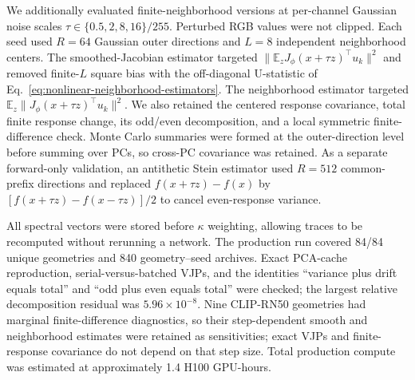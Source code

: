 We additionally evaluated finite-neighborhood versions at per-channel Gaussian
noise scales $\tau\in\{0.5,2,8,16\}/255$.  Perturbed RGB values were not
clipped.  Each seed used $R=64$ Gaussian outer directions and $L=8$
independent neighborhood centers.  The smoothed-Jacobian estimator targeted
$\|\mathbb E_z J_\phi(x+\tau z)^\top u_k\|^2$ and removed finite-$L$ square
bias with the off-diagonal U-statistic of
Eq.~\ref{eq:nonlinear-neighborhood-estimators}.  The neighborhood estimator
targeted $\mathbb E_z\|J_\phi(x+\tau z)^\top u_k\|^2$.  We also retained the
centered response covariance, total finite response change, its odd/even
decomposition, and a local symmetric finite-difference check.  Monte Carlo
summaries were formed at the outer-direction level before summing over PCs, so
cross-PC covariance was retained.  As a separate forward-only validation, an
antithetic Stein estimator used $R=512$ common-prefix directions and replaced
$f(x+\tau z)-f(x)$ by
$[f(x+\tau z)-f(x-\tau z)]/2$ to cancel even-response variance.

All spectral vectors were stored before $\kappa$ weighting, allowing traces to
be recomputed without rerunning a network.  The production run covered 84/84
unique geometries and 840 geometry--seed archives.  Exact PCA-cache
reproduction, serial-versus-batched VJPs, and the identities ``variance plus
drift equals total'' and ``odd plus even equals total'' were checked; the
largest relative decomposition residual was $5.96\times10^{-8}$.  Nine
CLIP-RN50 geometries had marginal finite-difference diagnostics, so their
step-dependent smooth and neighborhood estimates were retained as
sensitivities; exact VJPs and finite-response covariance do not depend on that
step size.  Total production compute was estimated at approximately 1.4 H100 GPU-hours.

